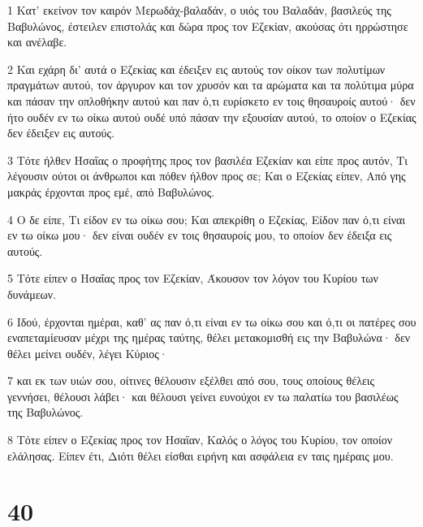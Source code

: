 \par 1 Κατ' εκείνον τον καιρόν Μερωδάχ-βαλαδάν, ο υιός του Βαλαδάν, βασιλεύς της Βαβυλώνος, έστειλεν επιστολάς και δώρα προς τον Εζεκίαν, ακούσας ότι ηρρώστησε και ανέλαβε.
\par 2 Και εχάρη δι' αυτά ο Εζεκίας και έδειξεν εις αυτούς τον οίκον των πολυτίμων πραγμάτων αυτού, τον άργυρον και τον χρυσόν και τα αρώματα και τα πολύτιμα μύρα και πάσαν την οπλοθήκην αυτού και παν ό,τι ευρίσκετο εν τοις θησαυροίς αυτού· δεν ήτο ουδέν εν τω οίκω αυτού ουδέ υπό πάσαν την εξουσίαν αυτού, το οποίον ο Εζεκίας δεν έδειξεν εις αυτούς.
\par 3 Τότε ήλθεν Ησαΐας ο προφήτης προς τον βασιλέα Εζεκίαν και είπε προς αυτόν, Τι λέγουσιν ούτοι οι άνθρωποι και πόθεν ήλθον προς σε; Και ο Εζεκίας είπεν, Από γης μακράς έρχονται προς εμέ, από Βαβυλώνος.
\par 4 Ο δε είπε, Τι είδον εν τω οίκω σου; Και απεκρίθη ο Εζεκίας, Είδον παν ό,τι είναι εν τω οίκω μου· δεν είναι ουδέν εν τοις θησαυροίς μου, το οποίον δεν έδειξα εις αυτούς.
\par 5 Τότε είπεν ο Ησαΐας προς τον Εζεκίαν, Άκουσον τον λόγον του Κυρίου των δυνάμεων.
\par 6 Ιδού, έρχονται ημέραι, καθ' ας παν ό,τι είναι εν τω οίκω σου και ό,τι οι πατέρες σου εναπεταμίευσαν μέχρι της ημέρας ταύτης, θέλει μετακομισθή εις την Βαβυλώνα· δεν θέλει μείνει ουδέν, λέγει Κύριος·
\par 7 και εκ των υιών σου, οίτινες θέλουσιν εξέλθει από σου, τους οποίους θέλεις γεννήσει, θέλουσι λάβει· και θέλουσι γείνει ευνούχοι εν τω παλατίω του βασιλέως της Βαβυλώνος.
\par 8 Τότε είπεν ο Εζεκίας προς τον Ησαΐαν, Καλός ο λόγος του Κυρίου, τον οποίον ελάλησας. Είπεν έτι, Διότι θέλει είσθαι ειρήνη και ασφάλεια εν ταις ημέραις μου.

\chapter{40}

